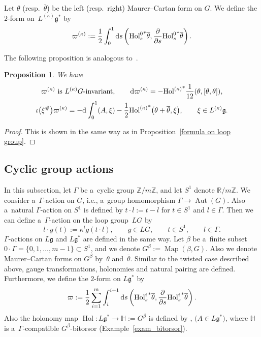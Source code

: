 \documentclass[10pt,a4paper]{amsart}
\numberwithin{equation}{section}
\newtheorem{Proposition}[Theorem]{Proposition}
\theoremstyle{definition}
\newcommand{\Map}{\operatorname{Map}}
\newcommand{\Aut}{\operatorname{Aut}}
\newcommand{\Hol}{\operatorname{Hol}}
\newcommand{\bH}{\mathbb{H}}
\newcommand{\bR}{\mathbb{R}}
\newcommand{\bZ}{\mathbb{Z}}
\begin{document}
Let $\theta$ (resp.\ $\overline{\theta}$) be the left (resp.\ right) Maurer--Cartan form on $G$.
We define the $2$-form on~$L^{(\kappa)}\mathfrak{g}^*$ by
\[
 \varpi ^{(\kappa)} := \frac{1}{2} \int_{0}^{1}{\rm d}s \left({\Hol^{0}_s}^* \overline{\theta}, \frac{\partial}{\partial s}{\Hol^{0}_s}^* \overline{\theta}\right).
 \]

The following proposition is analogous to~\cite[Proposition 8.1]{AMM}.

\begin{Proposition}We have
\begin{gather*}
 \varpi^{(\kappa)} \text{ is } L^{(\kappa)}G \text{-invariant},\qquad
 {\rm d} \varpi^{(\kappa)} = - {\Hol^{(\kappa)}}^* \frac{1}{12} (\theta,[\theta,\theta]),\\
 \iota\bigl(\xi^{\#}\bigr)\varpi^{(\kappa)} = - {\rm d} \int_{0}^{1}(A,\xi) - \frac{1}{2} {\Hol^{(\kappa)}}^*\bigl(\theta+\overline{\theta},\xi\bigr), \qquad \xi \in L^{(\kappa)}\mathfrak{g}.
\end{gather*}
\end{Proposition}

\begin{proof}
This is shown in the same way as in Proposition~\ref{formula on loop group}.
\end{proof}

\subsection{Cyclic group actions}

In this subsection, let $\Gamma$ be a~cyclic group $\bZ / m \bZ$, and let $S^{1}$ denote $\bR / m \bZ$.
We consider a~$\Gamma$-action on $G$, i.e., a~group homomorphism $\Gamma \to \Aut(G)$. Also a~natural $\Gamma$-action on $S^{1}$ is defined by
$ t \cdot l := t -l $ for $t \in S^{1}$ and $l \in \Gamma$.
Then we can define a~$\Gamma$-action on the loop group~$LG$ by
\[
l \cdot g (t) := \kappa^{l} g(t \cdot l) ,\qquad g \in LG,\qquad t \in S^{1},\qquad l \in \Gamma.
\]
$\Gamma$-actions on $L\mathfrak{g}$ and $L\mathfrak{g}^{*}$ are defined in the same way.
Let $\beta$ be a~finite subset $0\cdot \Gamma = \{0,1,\dots,\allowbreak {m-1}\} \subset S^{1}$, and we denote $G^{\beta} := \Map(\beta,G)$.
Also we denote Maurer--Cartan forms on $G^{\beta}$ by~$\theta$ and~$\overline{\theta}$.
Similar to the twisted case described above, gauge transformations, holonomies and natural pairing are defined.
Furthermore, we define the $2$-form on $L\mathfrak{g}^{*}$ by
\[
\varpi := \frac{1}{2} \sum_{i=1}^{m} \int_{i}^{i+1}{\rm d}s \left({\Hol^{i}_s}^{*}\overline{\theta},\frac{\partial}{\partial s}{\Hol^{i}_s}^{*}\overline{\theta}\right).
\]
Also the holonomy map $\Hol \colon L\mathfrak{g}^{*} \to \bH := G^{\beta}$ is defined by
\smash{$\Hol(A) := \bigl(\Hol^{i}_{i+1}(A)\bigr)^{m}_{i=1}$}, $\bigl(A \in L\mathfrak{g}^{*}\bigr)$,
where $\bH$ is a~$\Gamma$-compatible $G^{\beta}$-bitorsor (Example~\ref{exam_bitorsor}).
\end{document}
